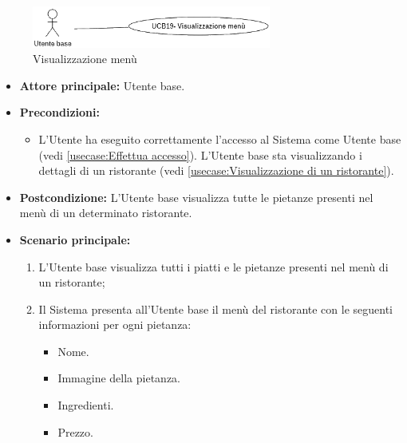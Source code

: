 \newpage
{}
\label{usecase:Visualizzazione menù}

\begin{figure}[h]
	\centering
	\includegraphics[width=0.7\textwidth]{./uml/UCB19.png} 
	\caption{Visualizzazione menù}
	\label{fig:UCB22}
  \end{figure}


\begin{itemize}
	\item \textbf{Attore principale:} Utente base.

	\item \textbf{Precondizioni:}
	      \begin{itemize}
		      \item L'Utente ha eseguito correttamente l'accesso al Sistema come
		            Utente base (vedi \autoref{usecase:Effettua accesso}).
					L'Utente base sta visualizzando i dettagli di un ristorante (vedi \autoref{usecase:Visualizzazione di un ristorante}).
	      \end{itemize}

	\item \textbf{Postcondizione:} L'Utente base visualizza tutte le pietanze presenti nel menù di un determinato ristorante.

	\item \textbf{Scenario principale:}
	      \begin{enumerate}
		      \item L'Utente base visualizza tutti i piatti e le pietanze presenti nel menù di un ristorante;
		      \item Il Sistema presenta all'Utente base il menù del ristorante con le seguenti informazioni per ogni pietanza:
		            \begin{itemize}
			            \item Nome.
			            \item Immagine della pietanza.
			            \item Ingredienti.
			            \item Prezzo.
		            \end{itemize}
	      \end{enumerate}
\end{itemize}

